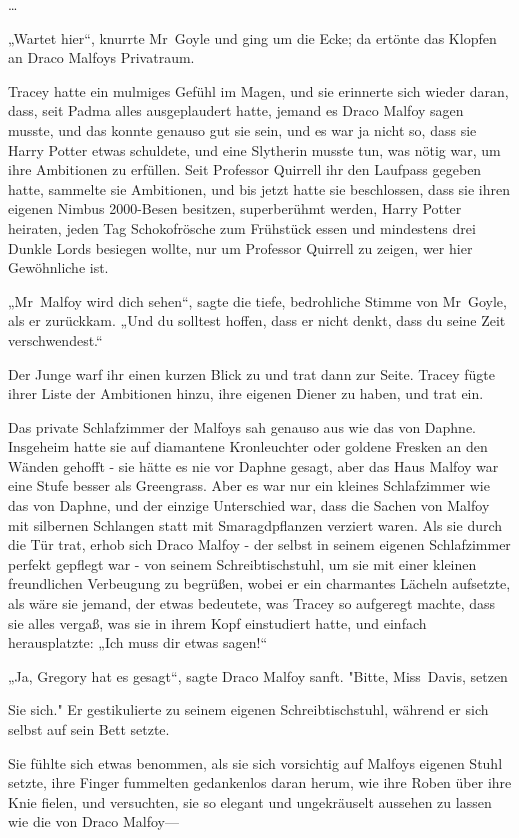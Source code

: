 {…

„Wartet hier“, knurrte Mr~Goyle und ging um die Ecke; da ertönte das Klopfen an Draco Malfoys Privatraum.

Tracey hatte ein mulmiges Gefühl im Magen, und sie erinnerte sich wieder daran, dass, seit Padma alles ausgeplaudert hatte, jemand es Draco Malfoy sagen musste, und das konnte genauso gut sie sein, und es war ja nicht so, dass sie Harry Potter etwas schuldete, und eine Slytherin musste tun, was nötig war, um ihre Ambitionen zu erfüllen. Seit Professor Quirrell ihr den Laufpass gegeben hatte, sammelte sie Ambitionen, und bis jetzt hatte sie beschlossen, dass sie ihren eigenen Nimbus 2000-Besen besitzen, superberühmt werden, Harry Potter heiraten, jeden Tag Schokofrösche zum Frühstück essen und mindestens drei Dunkle Lords besiegen wollte, nur um Professor Quirrell zu zeigen, wer hier Gewöhnliche ist.

„Mr~Malfoy wird dich sehen“, sagte die tiefe, bedrohliche Stimme von Mr~Goyle, als er zurückkam. „Und du solltest hoffen, dass er nicht denkt, dass du seine Zeit verschwendest.“

Der Junge warf ihr einen kurzen Blick zu und trat dann zur Seite. Tracey fügte ihrer Liste der Ambitionen hinzu, ihre eigenen Diener zu haben, und trat ein.

Das private Schlafzimmer der Malfoys sah genauso aus wie das von Daphne. Insgeheim hatte sie auf diamantene Kronleuchter oder goldene Fresken an den Wänden gehofft - sie hätte es nie vor Daphne gesagt, aber das Haus Malfoy war eine Stufe besser als Greengrass. Aber es war nur ein kleines Schlafzimmer wie das von Daphne, und der einzige Unterschied war, dass die Sachen von Malfoy mit silbernen Schlangen statt mit Smaragdpflanzen verziert waren. Als sie durch die Tür trat, erhob sich Draco Malfoy - der selbst in seinem eigenen Schlafzimmer perfekt gepflegt war - von seinem Schreibtischstuhl, um sie mit einer kleinen freundlichen Verbeugung zu begrüßen, wobei er ein charmantes Lächeln aufsetzte, als wäre sie jemand, der etwas bedeutete, was Tracey so aufgeregt machte, dass sie alles vergaß, was sie in ihrem Kopf einstudiert hatte, und einfach herausplatzte: „Ich muss dir etwas sagen!“

„Ja, Gregory hat es gesagt“, sagte Draco Malfoy sanft. "Bitte, Miss~Davis, setzen

Sie sich." Er gestikulierte zu seinem eigenen Schreibtischstuhl, während er sich selbst auf sein Bett setzte.

Sie fühlte sich etwas benommen, als sie sich vorsichtig auf Malfoys eigenen Stuhl setzte, ihre Finger fummelten gedankenlos daran herum, wie ihre Roben über ihre Knie fielen, und versuchten, sie so elegant und ungekräuselt aussehen zu lassen wie die von Draco Malfoy—

}
